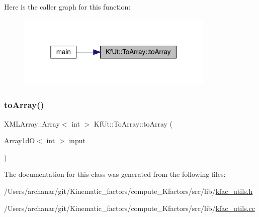 Here is the caller graph for this function\+:
\nopagebreak
\begin{figure}[H]
\begin{center}
\leavevmode
\includegraphics[width=267pt]{d3/dec/classKfUt_1_1ToArray_ac97892c7b8ae265fe9d91d3f823b3f98_icgraph}
\end{center}
\end{figure}
\mbox{\label{classKfUt_1_1ToArray_a272ebce4969f38835c7a503a85a4f8d3}} 
\subsubsection{\texorpdfstring{toArray()}{toArray()}\hspace{0.1cm}{\footnotesize\ttfamily [2/2]}}
{\footnotesize\ttfamily X\+M\+L\+Array\+::\+Array$<$ int $>$ Kf\+Ut\+::\+To\+Array\+::to\+Array (\begin{DoxyParamCaption}\item[{Array1dO$<$ int $>$}]{input }\end{DoxyParamCaption})\hspace{0.3cm}{\ttfamily [static]}}



The documentation for this class was generated from the following files\+:\begin{DoxyCompactItemize}
\item 
/\+Users/archanar/git/\+Kinematic\+\_\+factors/compute\+\_\+\+Kfactors/src/lib/\mbox{\hyperlink{kfac__utils_8h}{kfac\+\_\+utils.\+h}}\item 
/\+Users/archanar/git/\+Kinematic\+\_\+factors/compute\+\_\+\+Kfactors/src/lib/\mbox{\hyperlink{kfac__utils_8cc}{kfac\+\_\+utils.\+cc}}\end{DoxyCompactItemize}
